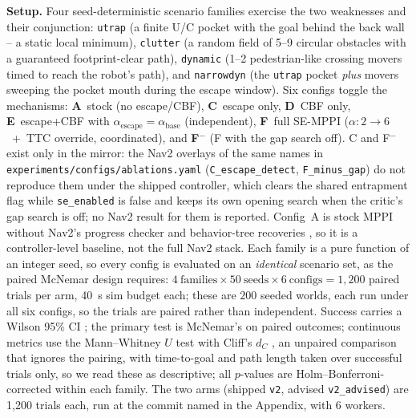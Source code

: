 \documentclass[journal]{IEEEtran}
\begin{document}
\textbf{Setup.} Four seed-deterministic scenario families exercise the two
weaknesses and their conjunction: \texttt{utrap} (a finite U/C pocket with
the goal behind the back wall -- a static local minimum), \texttt{clutter}
(a random field of 5--9 circular obstacles with a guaranteed
footprint-clear path), \texttt{dynamic} (1--2 pedestrian-like crossing
movers timed to reach the robot's path), and \texttt{narrowdyn} (the
\texttt{utrap} pocket \emph{plus} movers sweeping the pocket mouth during
the escape window). Six configs toggle the mechanisms:
\textbf{A}~stock (no escape/CBF), \textbf{C}~escape only, \textbf{D}~CBF
only, \textbf{E}~escape+CBF with
$\alpha_\text{escape}\!=\!\alpha_\text{base}$ (independent), \textbf{F}~full
SE-MPPI ($\alpha\!:\!2\!\to\!6$~+~TTC override, coordinated), and
\textbf{F$^{-}$} (F with the gap search off). C and F$^{-}$ exist only in the mirror: the
Nav2 overlays of the same names in \texttt{experiments/configs/ablations.yaml}
(\texttt{C\_escape\_detect}, \texttt{F\_minus\_gap}) do not reproduce them under the shipped
controller, which clears the shared entrapment flag while \texttt{se\_enabled} is false and
keeps its own opening search when the critic's gap search is off; no Nav2 result for them
is reported. Config~A is stock MPPI
without Nav2's progress checker and behavior-tree recoveries
\cite{nav2_progress,nav2_bt}, so it is a controller-level baseline, not
the full Nav2 stack. Each family is a pure function of an integer seed, so every
config is evaluated on an \emph{identical} scenario set, as the paired McNemar
design requires: $4~\text{families}\times50~\text{seeds}\times6~\text{configs}=1{,}200$
paired trials per arm, 40~s sim budget each; these are $200$ seeded worlds,
each run under all six configs, so the trials are paired rather than independent.
Success carries a Wilson 95\% CI \cite{wilson_ci}; the primary test is McNemar's
\cite{mcnemar} on paired outcomes; continuous metrics use the Mann--Whitney $U$
test \cite{mann_whitney} with Cliff's $d_C$ \cite{cliff_delta}, an unpaired
comparison that ignores the pairing, with time-to-goal and path length taken over
successful trials only, so we read these as descriptive; all $p$-values are
Holm--Bonferroni-corrected \cite{holm} within each family. The two arms
(shipped \texttt{v2}, advised \texttt{v2\_advised}) are 1{,}200 trials each, run at
the commit named in the Appendix, with 6 workers.
\end{document}
